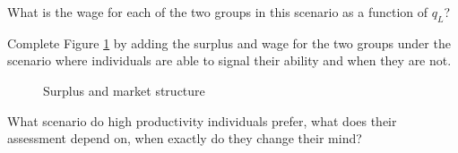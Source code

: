 \begin{boenumerate}

\item What is the wage for each of the two groups in this scenario as a function of $q_L$?

\item  Complete Figure \ref{Canvas Market Structure} by adding the surplus and wage for the two groups under the scenario where individuals are able to signal their ability and when they are not.

\begin{figure}[h]\centering
\caption{Surplus and market structure}\label{Canvas Market Structure}
\end{figure}

\item What scenario do high productivity individuals prefer, what does their assessment depend on, when exactly do they change their mind?

\end{boenumerate}

